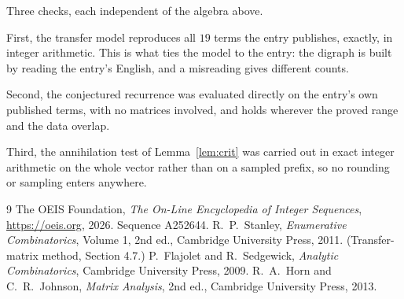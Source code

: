 \documentclass[11pt,a4paper]{article}
\theoremstyle{plain}
\theoremstyle{definition}
\begin{document}
Three checks, each independent of the algebra above.

First, the transfer model reproduces all $19$ terms the entry publishes, exactly, in
integer arithmetic. This is what ties the model to the entry: the digraph is built by reading
the entry's English, and a misreading gives different counts.

Second, the conjectured recurrence was evaluated directly on the entry's own published terms,
with no matrices involved, and holds wherever the proved range and the data overlap.

Third, the annihilation test of Lemma~\ref{lem:crit} was carried out in exact integer
arithmetic on the whole vector rather than on a sampled prefix, so no rounding or sampling
enters anywhere.

\begin{thebibliography}{9}
 The OEIS Foundation, \emph{The On-Line Encyclopedia of Integer
Sequences}, \url{https://oeis.org}, 2026. Sequence A252644.
 R.~P.~Stanley, \emph{Enumerative Combinatorics}, Volume 1, 2nd ed.,
Cambridge University Press, 2011. (Transfer-matrix method, Section 4.7.)
 P.~Flajolet and R.~Sedgewick, \emph{Analytic Combinatorics}, Cambridge
University Press, 2009.
 R.~A.~Horn and C.~R.~Johnson, \emph{Matrix Analysis}, 2nd ed., Cambridge
University Press, 2013.
\end{thebibliography}
\end{document}
